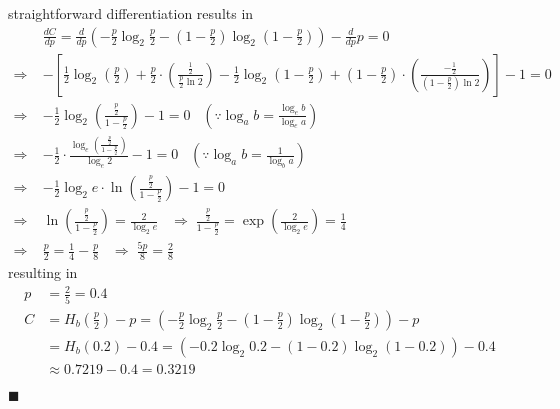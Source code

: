 \documentclass[a4paper,12pt]{article}
\begin{document}
\begin{enumerate}
            straightforward differentiation results in 
            \begin{align*}
                & \frac{dC}{dp} = \frac{d}{dp} \left( -\frac{p}{2} \log_2 \frac{p}{2} - (1 - \frac{p}{2}) \log_2 (1 - \frac{p}{2}) \right) - \frac{d}{dp} p = 0 \\ 
                \Rightarrow \; & - \left[ \frac{1}{2} \log_2 (\frac{p}{2}) + \frac{p}{2} \cdot \left( \frac{\frac{1}{2}}{\frac{p}{2} \ln 2} \right) - \frac{1}{2} \log_2 (1 - \frac{p}{2}) + (1 - \frac{p}{2}) \cdot \left( \frac{-\frac{1}{2}}{(1 - \frac{p}{2}) \ln 2}\right) \right] - 1 = 0 \\ 
                \Rightarrow \; & -\frac{1}{2} \log_2 (\frac{\frac{p}{2}}{1 - \frac{p}{2}} ) - 1 = 0 \;\;\; \left(\because \log_a b = \frac{\log_e b}{\log_e a} \right) \\
                \Rightarrow \; & -\frac{1}{2} \cdot \frac{\log_e (\frac{\frac{p}{2}}{1 - \frac{p}{2}})}{\log_e 2} - 1 = 0 \;\;\; \left(\because \log_a b = \frac{1}{\log_b a} \right) \\ 
                \Rightarrow \; & -\frac{1}{2} \log_2 e \cdot \ln (\frac{\frac{p}{2}}{1 - \frac{p}{2}}) - 1 = 0 \\
                \Rightarrow \; & \ln (\frac{\frac{p}{2}}{1 - \frac{p}{2}}) = \frac{2}{\log_2 e} \;\;\;
                \Rightarrow \; \frac{\frac{p}{2}}{1 - \frac{p}{2}} = \exp(\frac{2}{\log_2 e}) = \frac{1}{4} \\ 
                \Rightarrow \; & \frac{p}{2} = \frac{1}{4} - \frac{p}{8} \;\;\; \Rightarrow \; \frac{5p}{8} = \frac{2}{8}
            \end{align*}
            resulting in 
            \begin{align*}
               p &= \frac{2}{5} = 0.4 \\ 
               C &= H_b(\frac{p}{2}) - p = \left(-\frac{p}{2} \log_2 \frac{p}{2} - (1 - \frac{p}{2}) \log_2 (1 - \frac{p}{2})\right) - p \\
                 &= H_b(0.2) - 0.4 = \left( -0.2 \log_2 0.2 - (1 - 0.2) \log_2 (1 - 0.2) \right) - 0.4 \\ 
                 &\approx 0.7219 - 0.4 = 0.3219
            \end{align*}
            \begin{flushright}
                $\blacksquare$
            \end{flushright}

\end{enumerate}
\end{document}
